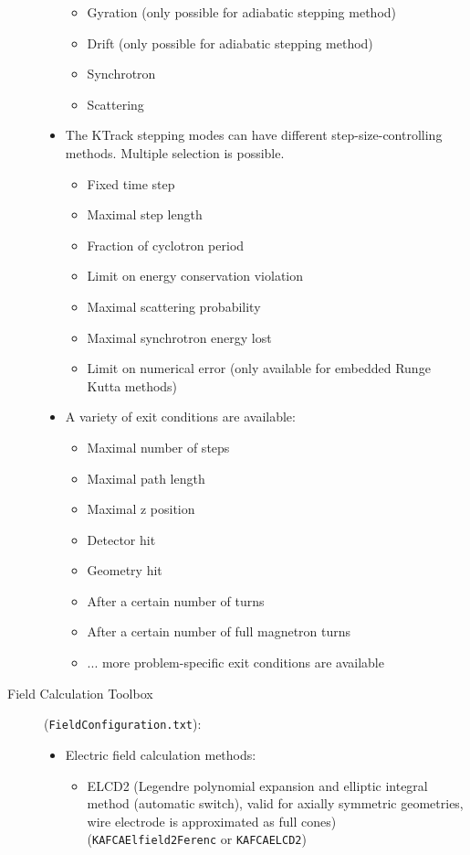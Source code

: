 \begin{description}
\begin{itemize}
\begin{itemize}
			\item Gyration (only possible for adiabatic stepping method)
			\item Drift (only possible for adiabatic stepping method)
			\item Synchrotron
			\item Scattering
		\end{itemize}
		\item The KTrack stepping modes can have different step-size-controlling methods. Multiple selection is possible.
		\begin{itemize}
			\item Fixed time step
			\item Maximal step length
			\item Fraction of cyclotron period
			\item Limit on energy conservation violation
			\item Maximal scattering probability
			\item Maximal synchrotron energy lost
			\item Limit on numerical error (only available for embedded Runge Kutta methods)
		\end{itemize}
		\item A variety of exit conditions are available:
		\begin{itemize}
			\item Maximal number of steps
			\item Maximal path length
			\item Maximal z position
			\item Detector hit
			\item Geometry hit
			\item After a certain number of turns
			\item After a certain number of full magnetron turns
			\item ... more problem-specific exit conditions are available
		\end{itemize}
	\end{itemize}
	\item[Field Calculation Toolbox] (\texttt{FieldConfiguration.txt}):
	\begin{itemize}
		\item Electric field calculation methods:
		\begin{itemize}
			\item ELCD2 (Legendre polynomial expansion and elliptic integral method (automatic switch), valid for axially symmetric geometries, wire electrode is approximated as full cones) (\texttt{KAFCAElfield2Ferenc} or \texttt{KAFCAELCD2})

\end{itemize}
\end{itemize}
\end{description}
